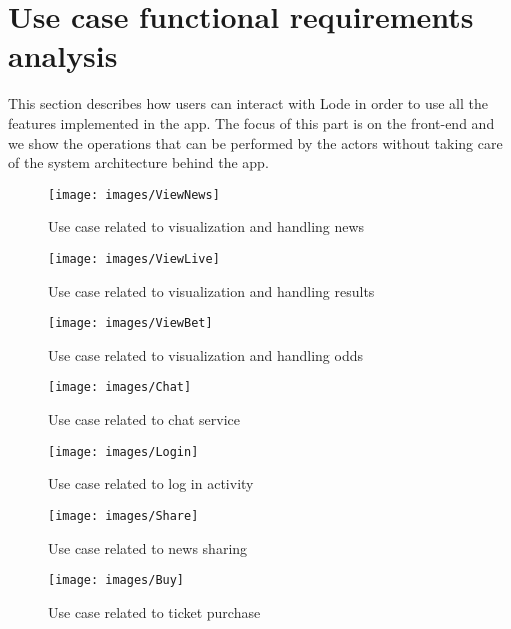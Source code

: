 \documentclass[numbers=noenddot, 12pt, a4paper, oneside]{scrbook}
\begin{document}
\chapter{Use case functional requirements analysis}
This section describes how users can interact with Lode in order to use all the features implemented in the app. The focus of this part is on the front-end and we show the operations that can be performed by the actors without taking care of the system architecture behind the app.
\begin{figure}[H]
	\centering
	\texttt{[image: images/ViewNews]}
	\caption{Use case related to visualization and handling news}
\end{figure}
\begin{figure}[H]
	\centering
	\texttt{[image: images/ViewLive]}
	\caption{Use case related to visualization and handling results}
\end{figure}
\begin{figure}[H]
	\centering
	\texttt{[image: images/ViewBet]}
	\caption{Use case related to visualization and handling odds}
\end{figure}
\begin{figure}[H]
	\centering
	\texttt{[image: images/Chat]}
	\caption{Use case related to chat service}
\end{figure}
\begin{figure}[H]
	\centering
	\texttt{[image: images/Login]}
	\caption{Use case related to log in activity}
\end{figure}
\begin{figure}[H]
	\centering
	\texttt{[image: images/Share]}
	\caption{Use case related to news sharing}
\end{figure}
\begin{figure}[H]
	\centering
	\texttt{[image: images/Buy]}
	\caption{Use case related to ticket purchase}
\end{figure}
\end{document}
